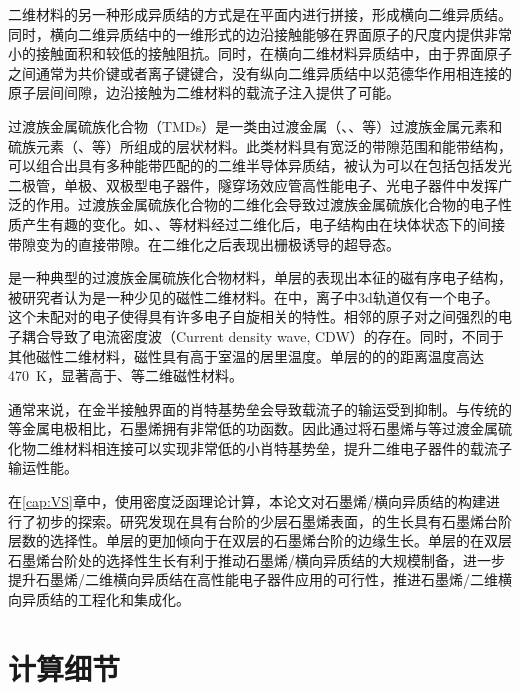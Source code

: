 二维材料的另一种形成异质结的方式是在平面内进行拼接，形成横向二维异质结。同时，横向二维异质结中的一维形式的边沿接触能够在界面原子的尺度内提供非常小的接触面积和较低的接触阻抗。同时，在横向二维材料异质结中，由于界面原子之间通常为共价键或者离子键键合，没有纵向二维异质结中以范德华作用相连接的原子层间间隙，边沿接触为二维材料的载流子注入提供了可能。

过渡族金属硫族化合物（TMDs）是一类由过渡金属（、、等）过渡族金属元素和硫族元素（、等）所组成的层状材料。此类材料具有宽泛的带隙范围和能带结构，可以组合出具有多种能带匹配的的二维半导体异质结，被认为可以在包括包括发光二极管，单极、双极型电子器件，隧穿场效应管高性能电子、光电子器件中发挥广泛的作用。过渡族金属硫族化合物的二维化会导致过渡族金属硫族化合物的电子性质产生有趣的变化。如、、等材料经过二维化后，电子结构由在块体状态下的间接带隙变为的直接带隙。在二维化之后表现出栅极诱导的超导态。

是一种典型的过渡族金属硫族化合物材料，单层的表现出本征的磁有序电子结构，被研究者认为是一种少见的磁性二维材料。在中，离子中3d轨道仅有一个电子。这个未配对的电子使得具有许多电子自旋相关的特性。相邻的原子对之间强烈的电子耦合导致了电流密度波（Current density wave, CDW）的存在。同时，不同于其他磁性二维材料，磁性具有高于室温的居里温度。单层的的的距离温度高达\SI{470}{\kelvin}，显著高于、等二维磁性材料。

通常来说，在金半接触界面的肖特基势垒会导致载流子的输运受到抑制。与传统的等金属电极相比，石墨烯拥有非常低的功函数。因此通过将石墨烯与等过渡金属硫化物二维材料相连接可以实现非常低的小肖特基势垒，提升二维电子器件的载流子输运性能。

在\ref{cap:VS}章中，使用密度泛函理论计算，本论文对石墨烯/横向异质结的构建进行了初步的探索。研究发现在具有台阶的少层石墨烯表面，的生长具有石墨烯台阶层数的选择性。单层的更加倾向于在双层的石墨烯台阶的边缘生长。单层的在双层石墨烯台阶处的选择性生长有利于推动石墨烯/横向异质结的大规模制备，进一步提升石墨烯/二维横向异质结在高性能电子器件应用的可行性，推进石墨烯/二维横向异质结的工程化和集成化。

\section{计算细节}


